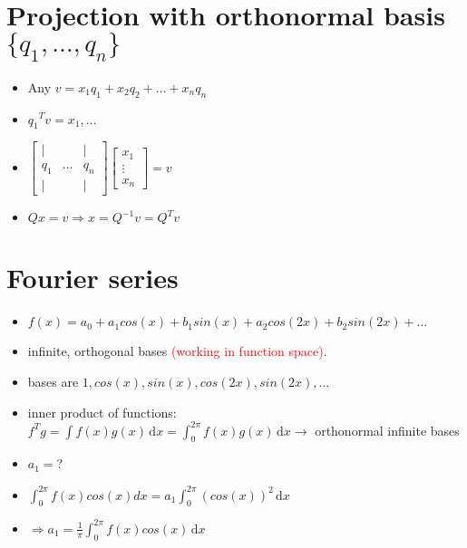 \documentclass[a4paper,12pt]{article}
\newcommand{\red}[1]{\textcolor{red}{#1}}
\newcommand{\ud}{\,\mathrm{d}}
\theoremstyle{definition} \newtheorem{Theorem}{Theorem}
\begin{document}
\section{Projection with orthonormal basis $\{q_1, \ldots, q_n\}$}
\begin{itemize}
	\item Any $v = x_1 q_1 + x_2 q_2 + \ldots + x_n q_n $
	\item ${q_1}^T v = x_1, \ldots$
	\item $\begin{bmatrix}
		\mid & & \mid \\
		q_1&\ldots&q_n\\
		\mid & & \mid 
	   \end{bmatrix} \begin{bmatrix} x_1 \\ \vdots \\ x_n \end{bmatrix} = v$
	   
	\item $ Qx=v \Rightarrow x = Q^{-1}v =  Q^T v $
\end{itemize}

\section{Fourier series}
\begin{itemize}
	\item $f(x) = a_0 + a_1 cos(x) + b_1 sin(x) + a_2 cos(2x) + b_2 sin(2x) + \ldots $
	\item infinite, orthogonal bases \red{(working in function space)}.
	\item bases are $1, cos(x), sin(x) , cos(2x), sin(2x), \ldots $
	\item inner product of functions: $f^T g = \int f(x) g(x)\ud x =  \int_0^{2\pi} f(x)g(x) \ud x \rightarrow$ orthonormal infinite bases
	\item $a_1 = $?
	\item $\int_0^{2\pi} f(x)cos(x)dx = a_1 \int_0^{2\pi} (cos(x))^2\ud x $
	\item $\Rightarrow a_1 = \frac{1}{\pi} \int_0^{2\pi} f(x)cos(x)\ud x $
\end{itemize}
\end{document}
